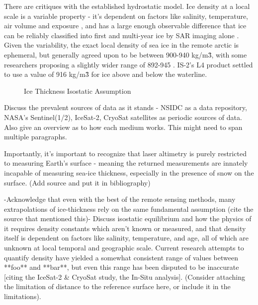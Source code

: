 There are critiques with the established hydrostatic model. Ice density at a local scale is a variable property - it's dependent on factors like salinity, temperature, air volume and exposure \cite{sea-ice-properties}, and has a large enough observable difference that ice can be reliably classified into first and multi-year ice by SAR imaging alone \cite{SAR-U-Net}. Given the variability, the exact local density of sea ice in the remote arctic is ephemeral, but generally agreed upon to be between 900-940 kg/m\^3, with some researchers proposing a slightly wider range of 892-945 \cite{sea-ice-properties}. IS-2's L4 product settled to use a value of 916 kg/m\^3 for ice above and below the waterline.

\begin{figure}[htb]
	\centering
	\caption{Ice Thickness Isostatic Assumption} \cite{ICESat-2-L4-Product}
	\label{fig:hydro-static-diagram}
\end{figure}

Discuss the prevalent sources of data as it stands - NSIDC as a data repository, NASA's Sentinel(1/2), IceSat-2, CryoSat satellites as periodic sources of data. Also give an overview as to how each medium works. This might need to span multiple paragraphs.

Importantly, it's important to recognize that laser altimetry is purely restricted to measuring Earth's surface - meaning the returned measurements are innately incapable of measuring sea-ice thickness, especially in the presence of snow on the surface. (Add source and put it in bibliography)

-Acknowledge that even with the best of the remote sensing methods, many extrapolations of ice-thickness rely on the same fundamental assumption (cite the source that mentioned this)-
Discuss isostatic equilibrium and how the physics of it requires density constants which aren't known or measured, and that density itself is dependent on factors like salinity, temperature, and age, all of which are unknown at local temporal and geographic scale. Current research attempts to quantify density have yielded a somewhat consistent range of values between **foo** and **bar**, but even this range has been disputed to be inaccurate [citing the IceSat-2 \& CryoSat study, the In-Situ analysis]. (Consider attaching the limitation of distance to the reference surface here, or include it in the limitations).

